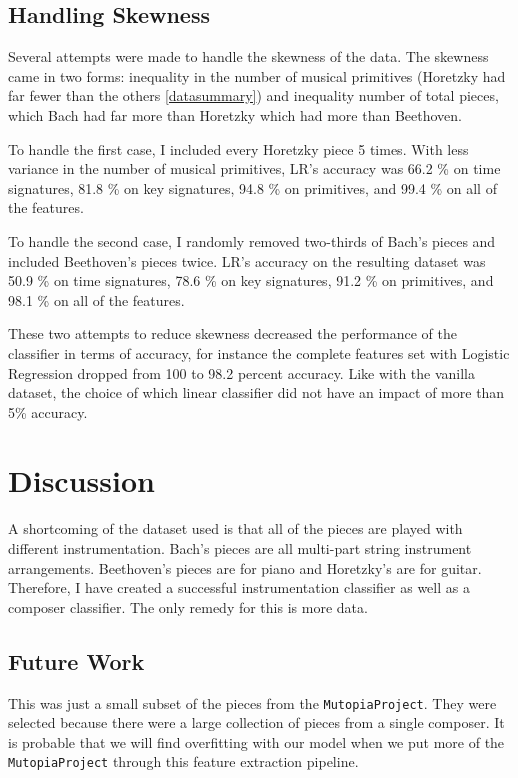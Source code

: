 \documentclass[10pt]{IEEEtran}
\begin{document}
\subsection{Handling Skewness}

Several attempts were made to handle the skewness of the data. The skewness
came in two forms: inequality in the number of musical primitives (Horetzky had
far fewer than the others \cref{datasummary}) and inequality number of total
pieces, which Bach had far more than Horetzky which had more than Beethoven.

To handle the first case, I included every Horetzky piece 5 times. With less
variance in the number of musical primitives, LR's accuracy was 66.2 \% on
time signatures, 81.8 \% on key signatures, 94.8 \% on primitives, and
99.4 \% on all of the features.

To handle the second case, I randomly removed two-thirds of Bach's pieces and
included Beethoven's pieces twice. LR's accuracy on the resulting dataset was
50.9 \% on time signatures, 78.6 \% on key signatures, 91.2 \% on primitives,
and 98.1 \% on all of the features.

These two attempts to reduce skewness decreased the performance of the
classifier in terms of accuracy, for instance the complete features set with
Logistic Regression dropped from 100 to 98.2 percent accuracy. Like with the
vanilla dataset, the choice of which linear classifier did not have an impact
of more than 5\% accuracy.

\section{Discussion}

A shortcoming of the dataset used is that all of the pieces are played with
different instrumentation. Bach's pieces are all multi-part string instrument
arrangements. Beethoven's pieces are for piano and Horetzky's are for guitar.
Therefore, I have created a successful instrumentation classifier as well
as a composer classifier. The only remedy for this is more data.

\subsection{Future Work}

This was just a small subset of the pieces from the {\tt MutopiaProject}. They
were selected because there were a large collection of pieces from a single
composer. It is probable that we will find overfitting with our model when we
put more of the {\tt MutopiaProject} through this feature extraction pipeline.
\end{document}
